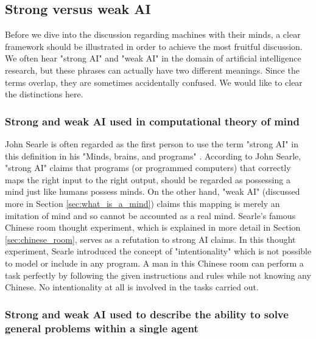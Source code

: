 \documentclass[11pt]{article}
\begin{document}

\subsection{Strong versus weak AI}

Before we dive into the discussion regarding machines with their minds, a clear framework should be illustrated in order to achieve the most fruitful discussion. We often hear "strong AI" and "weak AI" in the domain of artificial intelligence research, but these phrases can actually have two different meanings. Since the terms overlap, they are sometimes accidentally confused. We would like to clear the distinctions here.

\subsubsection*{Strong and weak AI used in computational theory of mind}

John Searle is often regarded as the first person to use the term "strong AI" in this definition in his "Minds, brains, and programs" \cite{searle1980minds}. According to John Searle, "strong AI" claims that programs (or programmed computers) that correctly maps the right input to the right output, should be regarded as possessing a mind just like humans possess minds. On the other hand, "weak AI" (discussed more in Section \ref{sec:what_is_a_mind}) claims this mapping is merely an imitation of mind and so cannot be accounted as a real mind. Searle's famous Chinese room thought experiment, which is explained in more detail in Section \ref{sec:chinese_room}, serves as a refutation to strong AI claims. In this thought experiment, Searle introduced the concept of "intentionality" which is not possible to model or include in any program. A man in this Chinese room can perform a task perfectly by following the given instructions and rules while not knowing any Chinese. No intentionality at all is involved in the tasks carried out. 

\subsubsection*{Strong and weak AI used to describe the ability to solve general problems within a single agent}
\end{document}
